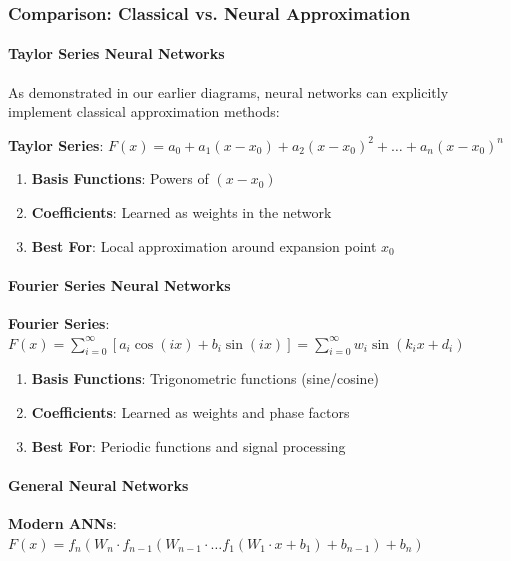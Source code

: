 \subsubsection{Comparison: Classical vs. Neural Approximation}
\label{subsubsec:classical-vs-neural}

\paragraph{Taylor Series Neural Networks}
\label{para:taylor-series-nn}

As demonstrated in our earlier diagrams, neural networks can explicitly implement classical approximation methods:

\textbf{Taylor Series}: $F(x) = a_0 + a_1(x - x_0) + a_2(x - x_0)^2 + \ldots + a_n(x - x_0)^n$

\begin{enumerate}
\item \textbf{Basis Functions}: Powers of $(x - x_0)$
\item \textbf{Coefficients}: Learned as weights in the network
\item \textbf{Best For}: Local approximation around expansion point $x_0$
\end{enumerate}

\paragraph{Fourier Series Neural Networks}
\label{para:fourier-series-nn}

\textbf{Fourier Series}: $F(x) = \sum_{i=0}^{\infty} \left[a_i \cos(ix) + b_i \sin(ix)\right] = \sum_{i=0}^{\infty} w_i \sin(k_i x + d_i)$

\begin{enumerate}
\item \textbf{Basis Functions}: Trigonometric functions (sine/cosine)
\item \textbf{Coefficients}: Learned as weights and phase factors
\item \textbf{Best For}: Periodic functions and signal processing
\end{enumerate}

\paragraph{General Neural Networks}
\label{para:general-nn}

\textbf{Modern ANNs}: $F(x) = f_n\left(W_n \cdot f_{n-1}\left(W_{n-1} \cdot \ldots f_1(W_1 \cdot x + b_1) + b_{n-1}\right) + b_n\right)$


